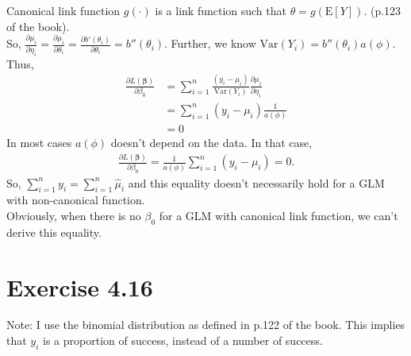 \documentclass[a4paper]{article}
\newcommand{\E}{\mathrm{E}}
\newcommand{\Var}{\mathrm{Var}}
\begin{document}
Canonical link function $g(\cdot)$ is a link function such that $\theta = g\left(\E[Y] \right)$. (p.123 of the book).\\
So, $\frac{\partial \mu_{i}}{\partial \eta_{i}} = \frac{\partial \mu_{i}}{\partial \theta_{i}} = \frac{\partial b'(\theta_{i})}{\partial \theta_{i}} = b''(\theta_{i})$. Further, we know $\Var(Y_{i}) = b''(\theta_{i})a(\phi)$.\\
Thus,
\begin{align*}
\frac{\partial L(\bm{\beta})}{\partial \beta_{0}} &= \sum_{i=1}^{n}\frac{(y_{i}-\mu_{i})}{\Var(Y_{i})}\frac{\partial \mu_{i}}{\partial \eta_{i}}\\
&= \sum_{i=1}^{n}(y_{i}-\mu_{i})\frac{1}{a(\phi)}\\
&= 0
\end{align*}
In most cases $a(\phi)$ doesn't depend on the data. In that case, 
\begin{align*}
\frac{\partial L(\bm{\beta})}{\partial \beta_{0}} = \frac{1}{a(\phi)}\sum_{i=1}^{n}(y_{i}-\mu_{i}) = 0.
\end{align*}
So, $\sum_{i=1}^{n}y_{i} = \sum_{i=1}^{n}\widehat{\mu}_{i}$ and this equality doesn't necessarily hold for a GLM with non-canonical function.\\
Obviously, when there is no $\beta_{0}$ for a GLM with canonical link function, we can't derive this equality.


\vspace{\baselineskip}
\section{Exercise 4.16}
Note: I use the binomial distribution as defined in p.122 of the book. This implies that $y_{i}$ is a proportion of success, instead of a number of success.
\end{document}
